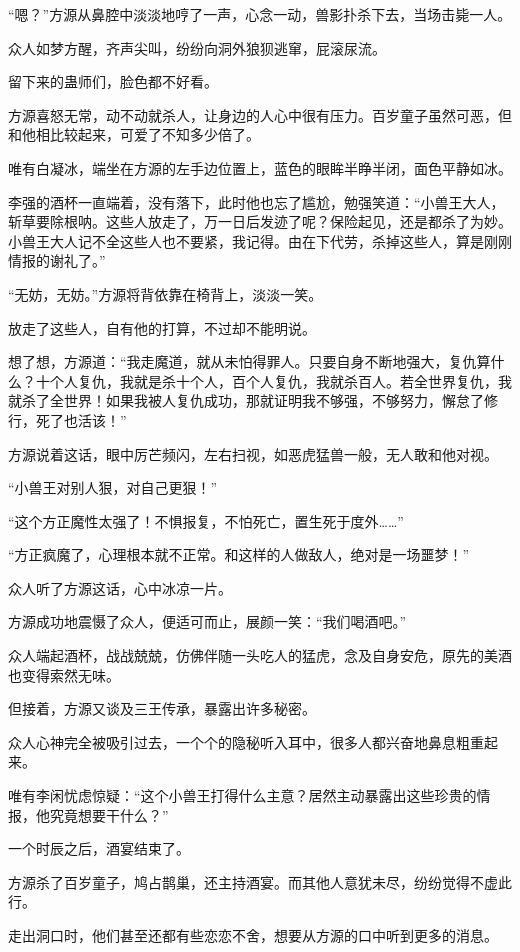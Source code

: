 \begin{this_body}
“嗯？”方源从鼻腔中淡淡地哼了一声，心念一动，兽影扑杀下去，当场击毙一人。

众人如梦方醒，齐声尖叫，纷纷向洞外狼狈逃窜，屁滚尿流。

留下来的蛊师们，脸色都不好看。

方源喜怒无常，动不动就杀人，让身边的人心中很有压力。百岁童子虽然可恶，但和他相比较起来，可爱了不知多少倍了。

唯有白凝冰，端坐在方源的左手边位置上，蓝色的眼眸半睁半闭，面色平静如冰。

李强的酒杯一直端着，没有落下，此时他也忘了尴尬，勉强笑道：“小兽王大人，斩草要除根呐。这些人放走了，万一日后发迹了呢？保险起见，还是都杀了为妙。小兽王大人记不全这些人也不要紧，我记得。由在下代劳，杀掉这些人，算是刚刚情报的谢礼了。”

“无妨，无妨。”方源将背依靠在椅背上，淡淡一笑。

放走了这些人，自有他的打算，不过却不能明说。

想了想，方源道：“我走魔道，就从未怕得罪人。只要自身不断地强大，复仇算什么？十个人复仇，我就是杀十个人，百个人复仇，我就杀百人。若全世界复仇，我就杀了全世界！如果我被人复仇成功，那就证明我不够强，不够努力，懈怠了修行，死了也活该！”

方源说着这话，眼中厉芒频闪，左右扫视，如恶虎猛兽一般，无人敢和他对视。

“小兽王对别人狠，对自己更狠！”

“这个方正魔性太强了！不惧报复，不怕死亡，置生死于度外……”

“方正疯魔了，心理根本就不正常。和这样的人做敌人，绝对是一场噩梦！”

众人听了方源这话，心中冰凉一片。

方源成功地震慑了众人，便适可而止，展颜一笑：“我们喝酒吧。”

众人端起酒杯，战战兢兢，仿佛伴随一头吃人的猛虎，念及自身安危，原先的美酒也变得索然无味。

但接着，方源又谈及三王传承，暴露出许多秘密。

众人心神完全被吸引过去，一个个的隐秘听入耳中，很多人都兴奋地鼻息粗重起来。

唯有李闲忧虑惊疑：“这个小兽王打得什么主意？居然主动暴露出这些珍贵的情报，他究竟想要干什么？”

一个时辰之后，酒宴结束了。

方源杀了百岁童子，鸠占鹊巢，还主持酒宴。而其他人意犹未尽，纷纷觉得不虚此行。

走出洞口时，他们甚至还都有些恋恋不舍，想要从方源的口中听到更多的消息。


\end{this_body}
